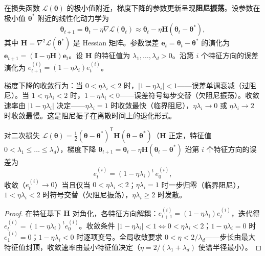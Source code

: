 \begin{definition}[梯度下降的振荡收敛]\label{def:gradient_descent_oscillation}
在损失函数 $\mathcal{L}(\boldsymbol{\theta})$ 的极小值附近，梯度下降的参数更新呈现\textbf{阻尼振荡}。设参数在极小值 $\boldsymbol{\theta}^*$ 附近的线性化动力学为
\[
\boldsymbol{\theta}_{t+1} = \boldsymbol{\theta}_t - \eta \nabla \mathcal{L}(\boldsymbol{\theta}_t) \approx \boldsymbol{\theta}_t - \eta \mathbf{H} (\boldsymbol{\theta}_t - \boldsymbol{\theta}^*),
\]
其中 $\mathbf{H} = \nabla^2 \mathcal{L}(\boldsymbol{\theta}^*)$ 是 Hessian 矩阵。参数误差 $\mathbf{e}_t = \boldsymbol{\theta}_t - \boldsymbol{\theta}^*$ 的演化为 $\mathbf{e}_{t+1} = (\mathbf{I} - \eta \mathbf{H}) \mathbf{e}_t$。设 $\mathbf{H}$ 的特征值为 $\lambda_1, \dots, \lambda_d > 0$。沿第 $i$ 个特征方向的误差演化为 $e_{t+1}^{(i)} = (1 - \eta \lambda_i) e_t^{(i)}$。

梯度下降的收敛行为：当 $0 < \eta \lambda_i < 2$ 时，$|1 - \eta \lambda_i| < 1$——误差单调衰减（过阻尼）。当 $1 < \eta \lambda_i < 2$ 时，$1 - \eta \lambda_i < 0$——误差符号每步交替（欠阻尼振荡）。收敛速率由 $|1 - \eta \lambda_i|$ 决定——$\eta \lambda_i = 1$ 时收敛最快（临界阻尼），$\eta \lambda_i \to 0$ 或 $\eta \lambda_i \to 2$ 时收敛最慢。这是阻尼振子在离散时间上的退化形式。
\end{definition}

\begin{lemma}[梯度下降的特征方向收敛]\label{ch32_gd_eigen}
对二次损失 $\mathcal{L}(\boldsymbol{\theta}) = \frac{1}{2}(\boldsymbol{\theta}-\boldsymbol{\theta}^*)^{\mathsf T}\mathbf{H}(\boldsymbol{\theta}-\boldsymbol{\theta}^*)$（$\mathbf{H}$ 正定，特征值 $0 < \lambda_1 \le \dots \le \lambda_d$），梯度下降 $\boldsymbol{\theta}_{t+1} = \boldsymbol{\theta}_t - \eta\mathbf{H}(\boldsymbol{\theta}_t - \boldsymbol{\theta}^*)$ 沿第 $i$ 个特征方向的误差为
\[
e_t^{(i)} = (1 - \eta\lambda_i)^t \, e_0^{(i)},
\]
收敛（$e_t^{(i)} \to 0$）当且仅当 $0 < \eta\lambda_i < 2$；$\eta\lambda_i = 1$ 时一步归零（临界阻尼），$1 < \eta\lambda_i < 2$ 时符号交替（欠阻尼振荡），$\eta\lambda_i \ge 2$ 时发散。
\end{lemma}

\begin{proof}
在特征基下 $\mathbf{H}$ 对角化，各特征方向解耦：$e_{t+1}^{(i)} = (1-\eta\lambda_i) e_t^{(i)}$，迭代得 $e_t^{(i)} = (1-\eta\lambda_i)^t e_0^{(i)}$。收敛条件 $|1-\eta\lambda_i| < 1 \Leftrightarrow 0 < \eta\lambda_i < 2$；$1-\eta\lambda_i = 0$ 时 $e_1^{(i)} = 0$；$1-\eta\lambda_i < 0$ 时逐项变号。全局收敛要求 $0 < \eta < 2/\lambda_d$——步长由最大特征值封顶，收敛速率由最小特征值决定（$\eta = 2/(\lambda_1+\lambda_d)$ 使谱半径最小）。
\end{proof}

